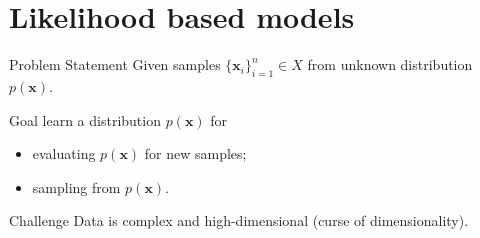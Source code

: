 \documentclass{beamer}
\newcommand{\bx}{\mathbf{x}}
\begin{document}
\section{Likelihood based models}
\begin{frame}{Problem Statement}
Given samples $\{\bx_i\}_{i=1}^n \in X$ from unknown distribution $p(\bx)$.

\begin{block}{Goal}
	learn a distribution $p(\bx)$ for 
	\begin{itemize}
	    \item evaluating $p(\bx)$ for new samples;
	    \item sampling from $p(\bx)$.
	\end{itemize}
\end{block}
\begin{block}{Challenge}
	 Data is complex and high-dimensional (curse of dimensionality).
\end{block}
\end{frame}
\end{document}
